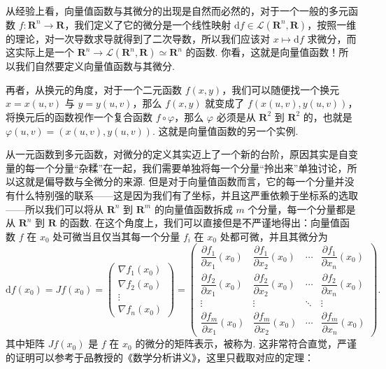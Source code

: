 从经验上看，向量值函数与其微分的出现是自然而必然的，对于一个一般的多元函数 $f\colon \mathbf{R}^n\to \mathbf{R}$，我们定义了它的微分是一个线性映射 $\mathrm{d}f\in \mathcal{L}(\mathbf{R}^n, \mathbf{R})$，按照一维的理论，对一次导数求导就得到了二次导数，所以我们应该对 $x \mapsto \mathrm{d}f$ 求微分，而这实际上是一个 $\mathbf{R}^n\to \mathcal{L}(\mathbf{R}^n,\mathbf{R})\simeq \mathbf{R}^n$ 的函数. 你看，这就是向量值函数！所以我们自然要定义向量值函数与其微分.

再者，从换元的角度，对于一个二元函数 $f(x, y)$，我们可以随便找一个换元 $x = x(u, v)$ 与 $y = y(u, v)$，那么 $f(x, y)$ 就变成了 $f(x(u, v), y(u, v))$，将换元后的函数视作一个复合函数 $f\circ \varphi$，那么 $\varphi$ 必须是从 $\mathbf{R}^2$ 到 $\mathbf{R}^2$ 的，也就是 $\varphi(u, v) = (x(u, v), y(u, v))$. 这就是向量值函数的另一个实例.

从一元函数到多元函数，对微分的定义其实迈上了一个新的台阶，原因其实是自变量的每一个分量“杂糅”在一起，我们需要单独将每一个分量“拎出来”单独讨论，所以这就是偏导数与全微分的来源. 但是对于向量值函数而言，它的每一个分量并没有什么特别强的联系——这是因为我们有了坐标，并且这严重依赖于坐标系的选取——所以我们可以将从 $\mathbf{R}^n$ 到 $\mathbf{R}^m$ 的向量值函数拆成 $m$ 个分量，每一个分量都是从 $\mathbf{R}^n$ 到 $\mathbf{R}$ 的函数. 在这个角度上，我们可以直接但是不严谨地得出：向量值函数 $f$ 在 $x_0$ 处可微当且仅当其每一个分量 $f_i$ 在 $x_0$ 处都可微，并且其微分为
\[
    \mathrm{d}f(x_0) = Jf(x_0) =
    \begin{pmatrix} \nabla f_1(x_0) \\ \nabla f_2(x_0) \\ \vdots \\ \nabla f_n(x_0) \end{pmatrix} =
    \begin{pmatrix}
        \dfrac{\partial f_1}{\partial x_1}(x_0) & \dfrac{\partial f_1}{\partial x_2}(x_0) & \cdots & \dfrac{\partial f_1}{\partial x_n}(x_0) \\[2ex]
        \dfrac{\partial f_2}{\partial x_1}(x_0) & \dfrac{\partial f_2}{\partial x_2}(x_0) & \cdots & \dfrac{\partial f_2}{\partial x_n}(x_0) \\[2ex]
        \vdots                                  & \vdots                                  & \ddots & \vdots                                  \\[2ex]
        \dfrac{\partial f_m}{\partial x_1}(x_0) & \dfrac{\partial f_m}{\partial x_2}(x_0) & \cdots & \dfrac{\partial f_m}{\partial x_n}(x_0)
    \end{pmatrix}.
\]
其中矩阵 $Jf(x_0)$ 是 $f$ 在 $x_0$ 的微分的矩阵表示，被称为. 这非常符合直觉，严谨的证明可以参考于品教授的《数学分析讲义》，这里只截取对应的定理：

